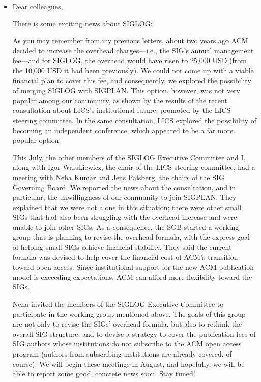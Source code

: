 \documentclass[prodmode,acmtecs]{acmsmall} %
\begin{document}
\begin{itemize}\item  Dear colleagues, 
 
  There is some exciting news about SIGLOG: 
 
  As you may remember from my previous letters, about two years ago ACM decided to increase the overhead charges—i.e., the SIG's annual management fee—and for SIGLOG, the overhead would have risen to 25,000 USD (from the 10,000 USD it had been previously). We could not come up with a viable financial plan to cover this fee, and consequently, we explored the possibility of merging SIGLOG with SIGPLAN. This option, however, was not very popular among our community, as shown by the results of the recent consultation about LICS’s institutional future, promoted by the LICS steering committee. In the same consultation, LICS explored the possibility of becoming an independent conference, which appeared to be a far more popular option. 
 
  This July, the other members of the SIGLOG Executive Committee and I, along with Igor Walukiewicz, the chair of the LICS steering committee, had a meeting with Neha Kumar and Jens Palsberg, the chairs of the SIG Governing Board. We reported the news about the consultation, and in particular, the unwillingness of our community to join SIGPLAN. They explained that we were not alone in this situation; there were other small SIGs that had also been struggling with the overhead increase and were unable to join other SIGs. As a consequence, the SGB started a working group that is planning to revise the overhead formula, with the express goal of helping small SIGs achieve financial stability. They said the current formula was devised to help cover the financial cost of ACM’s transition toward open access. Since institutional support for the new ACM publication model is exceeding expectations, ACM can afford more flexibility toward the SIGs. 
 
  Neha invited the members of the SIGLOG Executive Committee to participate in the working group mentioned above. The goals of this group are not only to revise the SIGs’ overhead formula, but also to rethink the overall SIG structure, and to devise a strategy to cover the publication fees of SIG authors whose institutions do not subscribe to the ACM open access program (authors from subscribing institutions are already covered, of course). We will begin these meetings in August, and hopefully, we will be able to report some good, concrete news soon. Stay tuned! 
 

\end{itemize}
\end{document}
